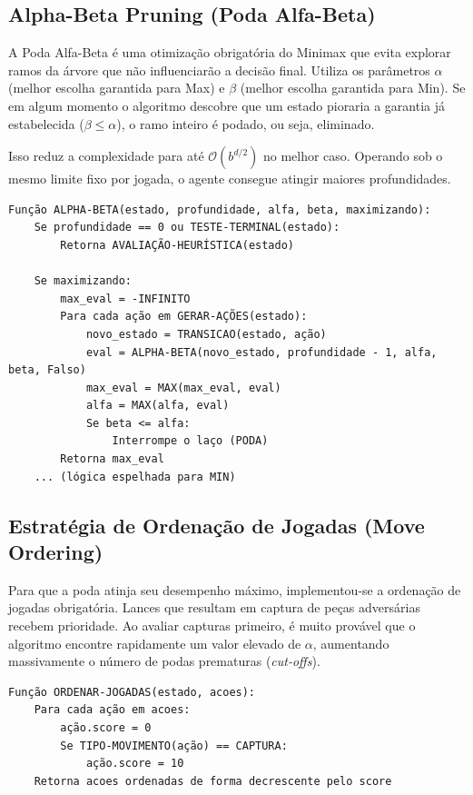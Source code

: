\documentclass[12pt,a4paper]{article}
\begin{document}
\subsection{Alpha-Beta Pruning (Poda Alfa-Beta)}
A Poda Alfa-Beta é uma otimização obrigatória do Minimax que evita explorar ramos da árvore que não influenciarão 
a decisão final. Utiliza os parâmetros $\alpha$ (melhor escolha garantida para Max) e $\beta$ (melhor escolha garantida para Min).
Se em algum momento o algoritmo descobre que um estado pioraria a garantia já estabelecida ($\beta \leq \alpha$), 
o ramo inteiro é podado, ou seja, eliminado.

Isso reduz a complexidade para até $\mathcal{O}(b^{d/2})$ no melhor caso. 
Operando sob o mesmo limite fixo por jogada, o agente consegue atingir maiores profundidades.

\begin{verbatim}
Função ALPHA-BETA(estado, profundidade, alfa, beta, maximizando):
    Se profundidade == 0 ou TESTE-TERMINAL(estado):
        Retorna AVALIAÇÃO-HEURÍSTICA(estado)
        
    Se maximizando:
        max_eval = -INFINITO
        Para cada ação em GERAR-AÇÕES(estado):
            novo_estado = TRANSICAO(estado, ação)
            eval = ALPHA-BETA(novo_estado, profundidade - 1, alfa, beta, Falso)
            max_eval = MAX(max_eval, eval)
            alfa = MAX(alfa, eval)
            Se beta <= alfa:
                Interrompe o laço (PODA)
        Retorna max_eval
    ... (lógica espelhada para MIN)
\end{verbatim}

\subsection{Estratégia de Ordenação de Jogadas (Move Ordering)}
Para que a poda atinja seu desempenho máximo, implementou-se a ordenação de jogadas obrigatória. 
Lances que resultam em captura de peças adversárias recebem prioridade. Ao avaliar capturas primeiro, 
é muito provável que o algoritmo encontre rapidamente um valor elevado de $\alpha$, aumentando massivamente 
o número de podas prematuras (\textit{cut-offs}).

\begin{verbatim}
Função ORDENAR-JOGADAS(estado, acoes):
    Para cada ação em acoes:
        ação.score = 0
        Se TIPO-MOVIMENTO(ação) == CAPTURA:
            ação.score = 10
    Retorna acoes ordenadas de forma decrescente pelo score
\end{verbatim}
\end{document}
